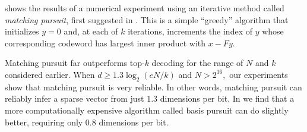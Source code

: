  shows the results of a numerical experiment using an iterative method called \textit{matching pursuit}, first suggested in \cite{bergeaud_matching_1995}. This is a simple ``greedy'' algorithm that initializes $y = 0$ and, at each of $k$ iterations, increments the index of $y$ whose corresponding codeword has largest inner product with $x - Fy.$

Matching pursuit far outperforms top-$k$ decoding for the range of $N$ and $k$ considered earlier. When $d \ge 1.3 \log_2 (e N /k)$ and $N > 2^{16},$ our experiments show that matching pursuit is very reliable. In other words, matching pursuit can reliably infer a sparse vector from just $1.3$ dimensions per bit. In  we find that a more computationally expensive algorithm called basis pursuit can do slightly better, requiring only 0.8 dimensions per bit.
